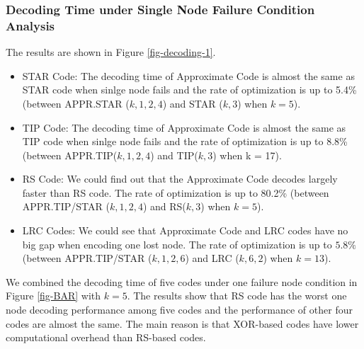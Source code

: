 \documentclass[sigconf]{acmart}
\begin{document}
\subsubsection{Decoding Time under Single Node Failure Condition Analysis}
The results are shown in Figure \ref{fig-decoding-1}.
\begin{itemize}
    \item STAR Code: The decoding time of Approximate Code is almost the same as STAR code when sinlge node fails and the rate of optimization is up to 5.4\% (between APPR.STAR ($k,1,2,4$) and STAR ($k,3$) when $k = 5$).
    \item TIP Code: The decoding time of Approximate Code is almost the same as TIP code when sinlge node fails and the rate of optimization is up to 8.8\% (between APPR.TIP($k,1,2,4$) and TIP($k,3$) when k = 17).
    \item RS Code: We could find out that the Approximate Code decodes largely faster than RS code. The rate of optimization is up to 80.2\% (between APPR.TIP/STAR ($k,1,2,4$) and RS($k,3$) when $k = 5$).
    \item LRC Codes: We could see that Approximate Code and LRC codes have no big gap when encoding one lost node. The rate of optimization is up to $5.8\%$ (between APPR.TIP/STAR ($k,1,2,6$) and LRC ($k, 6, 2$) when $k = 13$).
\end{itemize}

We combined the decoding time of five codes under one failure node condition in Figure \ref{fig-BAR} with $k=5$. The results show that RS code has the worst one node decoding performance among five codes and the performance of other four codes are almost the same. The main reason is that XOR-based codes have lower computational overhead than RS-based codes.\par
\end{document}
